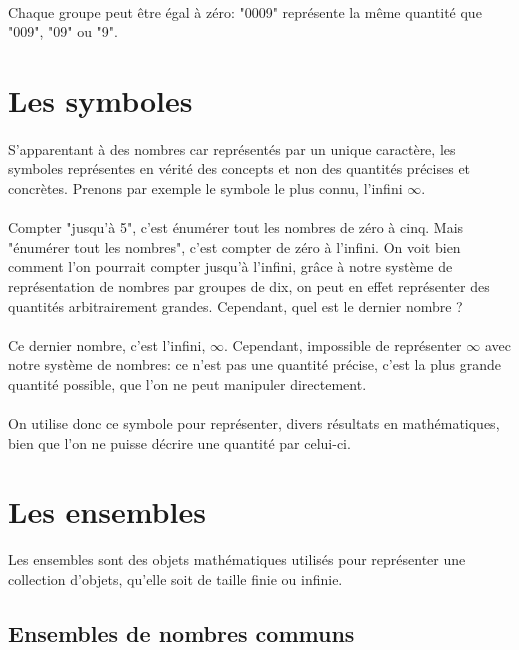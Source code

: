 \documentclass[a4paper]{book}
\begin{document}
    \paragraph{}
    Chaque groupe peut être égal à zéro: "0009" représente la même quantité que "009", "09" ou "9".
    
    \section{Les symboles}
    \paragraph{}
    S'apparentant à des nombres car représentés par un unique caractère, les symboles représentes en vérité des concepts et non des quantités précises et concrètes. Prenons par exemple le symbole le plus connu, l'infini $\infty$.
    \paragraph{}
    Compter "jusqu'à 5", c'est énumérer tout les nombres de zéro à cinq. Mais "énumérer tout les nombres", c'est compter de zéro à l'infini. On voit bien comment l'on pourrait compter jusqu'à l'infini, grâce à notre système de représentation de nombres par groupes de dix, on peut en effet représenter des quantités arbitrairement grandes. Cependant, quel est le dernier nombre ?
    \paragraph{}
    Ce dernier nombre, c'est l'infini, $\infty$. Cependant, impossible de représenter $\infty$ avec notre système de nombres: ce n'est pas une quantité précise, c'est la plus grande quantité possible, que l'on ne peut manipuler directement.
    \paragraph{}
    On utilise donc ce symbole pour représenter, divers résultats en mathématiques, bien que l'on ne puisse décrire une quantité par celui-ci.
    
    \section{Les ensembles}
    Les ensembles sont des objets mathématiques utilisés pour représenter une collection d'objets, qu'elle soit de taille finie ou infinie.
    \subsection{Ensembles de nombres communs}
\end{document}
